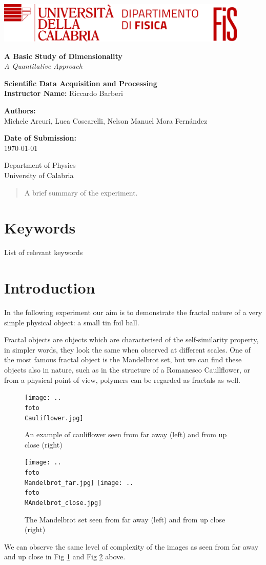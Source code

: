 \documentclass[a4paper,12pt]{article}
\newcommand{\customtitlepage}{
    

    \begin{titlepage}
        \includegraphics[width=0.9\textwidth]{logo.png}\\
        \centering
        \vspace*{1cm}
        
        \Huge\textbf{A Basic Study of Dimensionality}\\
        \vspace{0.5cm}
        \LARGE\textit{A Quantitative Approach}\\
        \vspace{1.5cm}
        
        \textbf{Scientific Data Acquisition and Processing} \\
        \textbf{Instructor Name:} Riccardo Barberi\\
        \vspace{0.5cm}
        
        \textbf{Authors:}\\
        \large Michele Arcuri, Luca Coscarelli, Nelson Manuel Mora Fernández\\
        \vfill
        
        \large \textbf{Date of Submission:}\\
        \today\\
        \vspace{1.5cm}
        
        \small
        Department of Physics \\
        University of Calabria\\
        \vspace{0.5cm}
    \end{titlepage}
}
\begin{document}
\customtitlepage

\begin{abstract}
    A brief summary of the experiment.
\end{abstract}


\section*{Keywords}
List of relevant keywords 

\newpage

\tableofcontents
\newpage

\section{Introduction}
In the following experiment our aim is to demonstrate the fractal nature 
of a very simple physical object: a small tin foil ball. 

Fractal objects are objects which are characterised of the self-similarity 
property, in simpler words, they look the same when observed at different scales.
One of the most famous fractal object is the Mandelbrot set, but we can find these 
objects also in nature, such as in the structure of a Romanesco Caullflower, or 
from a physical point of view, polymers can be regarded as fractals as well.

\begin{figure}
    \centering
    \texttt{[image: ..\\foto\\Cauliflower.jpg]}
    \caption{An example of cauliflower seen from far away (left) and from up close (right)}
    \label{fig:Cauliflower}
\end{figure}

\begin{figure}
    \centering
    \begin{minipage}{1\textwidth}
        \centering
        \texttt{[image: ..\\foto\\Mandelbrot\_far.jpg]}
        \texttt{[image: ..\\foto\\MAndelbrot\_close.jpg]}
    \end{minipage}
    \caption{The Mandelbrot set seen from far away (left) and from up close (right)}
    \label{fig:Mandelbrot}
\end{figure}

We can observe the same level of complexity of the images as seen from far away 
and up close in Fig \ref{fig:Cauliflower} and Fig \ref{fig:Mandelbrot} above.
\end{document}

